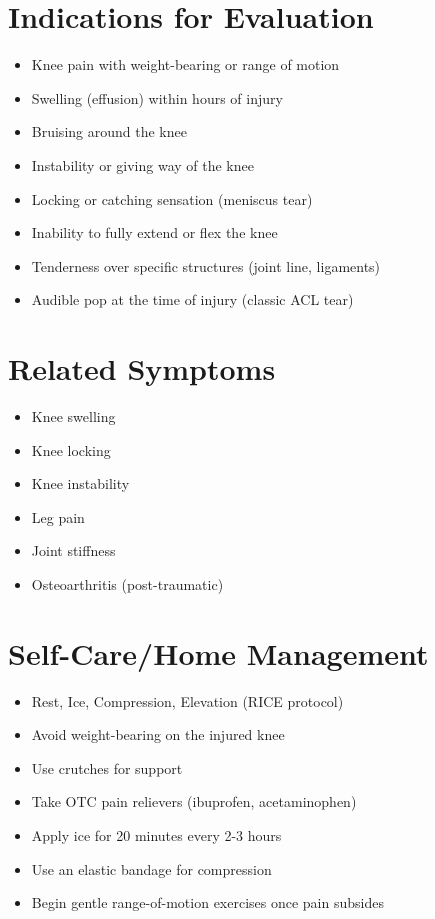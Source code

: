 \section{Indications for Evaluation}
\begin{itemize}
\item Knee pain with weight-bearing or range of motion
\item Swelling (effusion) within hours of injury
\item Bruising around the knee
\item Instability or giving way of the knee
\item Locking or catching sensation (meniscus tear)
\item Inability to fully extend or flex the knee
\item Tenderness over specific structures (joint line, ligaments)
\item Audible pop at the time of injury (classic ACL tear)
\end{itemize}

\section{Related Symptoms}
\begin{itemize}
\item Knee swelling
\item Knee locking
\item Knee instability
\item Leg pain
\item Joint stiffness
\item Osteoarthritis (post-traumatic)
\end{itemize}

\section{Self-Care/Home Management}
\begin{itemize}
\item Rest, Ice, Compression, Elevation (RICE protocol)
\item Avoid weight-bearing on the injured knee
\item Use crutches for support
\item Take OTC pain relievers (ibuprofen, acetaminophen)
\item Apply ice for 20 minutes every 2-3 hours
\item Use an elastic bandage for compression
\item Begin gentle range-of-motion exercises once pain subsides
\end{itemize}

